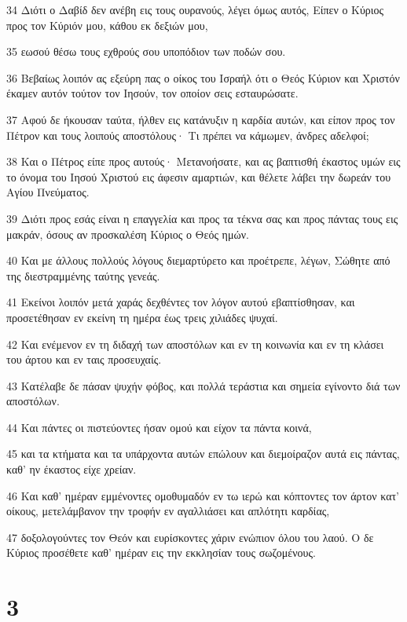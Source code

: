 \par 34 Διότι ο Δαβίδ δεν ανέβη εις τους ουρανούς, λέγει όμως αυτός, Είπεν ο Κύριος προς τον Κύριόν μου, κάθου εκ δεξιών μου,
\par 35 εωσού θέσω τους εχθρούς σου υποπόδιον των ποδών σου.
\par 36 Βεβαίως λοιπόν ας εξεύρη πας ο οίκος του Ισραήλ ότι ο Θεός Κύριον και Χριστόν έκαμεν αυτόν τούτον τον Ιησούν, τον οποίον σεις εσταυρώσατε.
\par 37 Αφού δε ήκουσαν ταύτα, ήλθεν εις κατάνυξιν η καρδία αυτών, και είπον προς τον Πέτρον και τους λοιπούς αποστόλους· Τι πρέπει να κάμωμεν, άνδρες αδελφοί;
\par 38 Και ο Πέτρος είπε προς αυτούς· Μετανοήσατε, και ας βαπτισθή έκαστος υμών εις το όνομα του Ιησού Χριστού εις άφεσιν αμαρτιών, και θέλετε λάβει την δωρεάν του Αγίου Πνεύματος.
\par 39 Διότι προς εσάς είναι η επαγγελία και προς τα τέκνα σας και προς πάντας τους εις μακράν, όσους αν προσκαλέση Κύριος ο Θεός ημών.
\par 40 Και με άλλους πολλούς λόγους διεμαρτύρετο και προέτρεπε, λέγων, Σώθητε από της διεστραμμένης ταύτης γενεάς.
\par 41 Εκείνοι λοιπόν μετά χαράς δεχθέντες τον λόγον αυτού εβαπτίσθησαν, και προσετέθησαν εν εκείνη τη ημέρα έως τρεις χιλιάδες ψυχαί.
\par 42 Και ενέμενον εν τη διδαχή των αποστόλων και εν τη κοινωνία και εν τη κλάσει του άρτου και εν ταις προσευχαίς.
\par 43 Κατέλαβε δε πάσαν ψυχήν φόβος, και πολλά τεράστια και σημεία εγίνοντο διά των αποστόλων.
\par 44 Και πάντες οι πιστεύοντες ήσαν ομού και είχον τα πάντα κοινά,
\par 45 και τα κτήματα και τα υπάρχοντα αυτών επώλουν και διεμοίραζον αυτά εις πάντας, καθ' ην έκαστος είχε χρείαν.
\par 46 Και καθ' ημέραν εμμένοντες ομοθυμαδόν εν τω ιερώ και κόπτοντες τον άρτον κατ' οίκους, μετελάμβανον την τροφήν εν αγαλλιάσει και απλότητι καρδίας,
\par 47 δοξολογούντες τον Θεόν και ευρίσκοντες χάριν ενώπιον όλου του λαού. Ο δε Κύριος προσέθετε καθ' ημέραν εις την εκκλησίαν τους σωζομένους.

\chapter{3}

